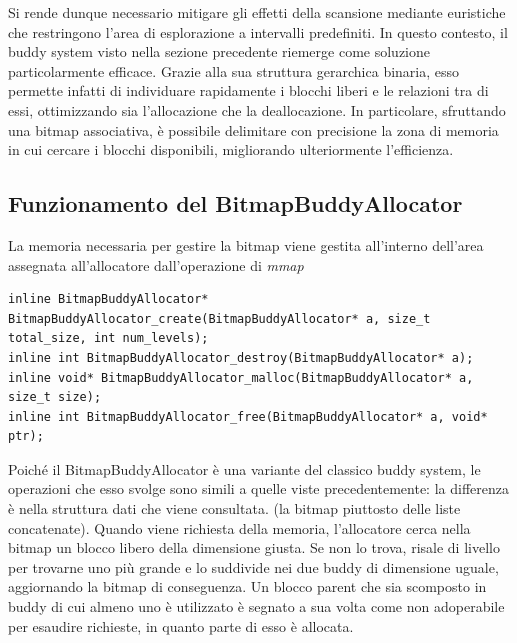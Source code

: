 Si rende dunque necessario mitigare gli effetti della scansione mediante euristiche che restringono l’area di esplorazione a intervalli predefiniti. In questo contesto, il buddy system visto nella sezione precedente riemerge come soluzione particolarmente efficace. Grazie alla sua struttura gerarchica binaria, esso permette infatti di individuare rapidamente i blocchi liberi e le relazioni tra di essi, ottimizzando sia l’allocazione che la deallocazione. In particolare, sfruttando una bitmap associativa, è possibile delimitare con precisione la zona di memoria in cui cercare i blocchi disponibili, migliorando ulteriormente l’efficienza.

\subsection*{Funzionamento del BitmapBuddyAllocator}
La memoria necessaria per gestire la bitmap viene gestita all'interno dell'area assegnata all'allocatore dall'operazione di \textit{mmap}

\begin{lstlisting}
inline BitmapBuddyAllocator* BitmapBuddyAllocator_create(BitmapBuddyAllocator* a, size_t total_size, int num_levels);
inline int BitmapBuddyAllocator_destroy(BitmapBuddyAllocator* a);
inline void* BitmapBuddyAllocator_malloc(BitmapBuddyAllocator* a, size_t size);
inline int BitmapBuddyAllocator_free(BitmapBuddyAllocator* a, void* ptr);
\end{lstlisting}

Poiché il BitmapBuddyAllocator è una variante del classico buddy system, le operazioni che esso svolge sono simili a quelle viste precedentemente: la differenza è nella struttura dati che viene consultata. (la bitmap piuttosto delle liste concatenate). Quando viene richiesta della memoria, l’allocatore cerca nella bitmap un blocco libero della dimensione giusta. Se non lo trova, risale di livello per trovarne uno più grande e lo suddivide nei due buddy di dimensione uguale, aggiornando la bitmap di conseguenza. Un blocco parent che sia scomposto in buddy di cui almeno uno è utilizzato è segnato a sua volta come non adoperabile per esaudire richieste, in quanto parte di esso è allocata.

